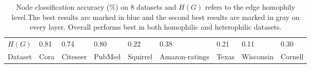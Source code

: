 \begin{table*}[t]
\centering
\caption{Node classification accuracy (\%) on 8 datasets and $H(G)$ refers to
the edge homophily level.The best results are marked in blue and the second best results are marked in gray on every layer. Overall \ours performs best in both homophilic and heterophilic datasets.
} %
\begin{adjustbox}{width=0.95\textwidth}
\begin{tabular}{lllllllll}
\toprule
 $H(G)$ & 0.81 & 0.74 & 0.80 & 0.22 & 0.38 & 0.21 & 0.11 & 0.30\\
 Dataset            & Cora              & Citeseer              & PubMed            &Squirrel             &Amazon-ratings         & Texas    &  Wisconsin  &Cornell  \\


\end{tabular}
\end{adjustbox}
\end{table*}
